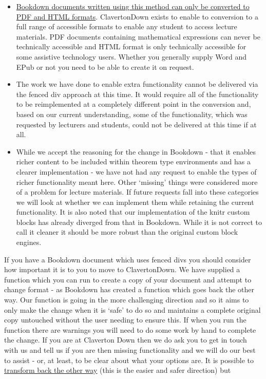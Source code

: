 \documentclass[
  17pt,
  a4paper]{extarticle}
\providecommand{\tightlist}{%
  \setlength{\itemsep}{0pt}\setlength{\parskip}{0pt}}
\theoremstyle{plain}
\theoremstyle{definition}
\theoremstyle{plain}
\theoremstyle{plain}
\theoremstyle{plain}
\theoremstyle{plain}
\theoremstyle{definition}
\theoremstyle{definition}
\theoremstyle{remark}
\theoremstyle{remark}
\renewcommand{\;}{\,}
\begin{document}
\begin{itemize}
\tightlist
\item
  \href{https://bookdown.org/yihui/bookdown/markdown-extensions-by-bookdown.html\#theorem-engine}{Bookdown documents written using this method can only be converted to PDF and HTML formats}. ClavertonDown exists to enable to conversion to a full range of accessible formats to enable any student to access lecture materials. PDF documents containing mathematical expressions can never be technically accessible and HTML format is only technically accessible for some assistive technology users. Whether you generally supply Word and EPub or not you need to be able to create it on request.
\item
  The work we have done to enable extra functionality cannot be delivered via the fenced div approach at this time. It would require all of the functionality to be reimplemented at a completely different point in the conversion and, based on our current understanding, some of the functionality, which was requested by lecturers and students, could not be delivered at this time if at all.
\item
  While we accept the reasoning for the change in Bookdown - that it enables richer content to be included within theorem type environments and has a clearer implementation - we have not had any request to enable the types of richer functionality meant here. Other `missing' things were considered more of a problem for lecture materials. If future requests fall into these categories we will look at whether we can implement them while retaining the current functionality. It is also noted that our implementation of the knitr custom blocks has already diverged from that in Bookdown. While it is not correct to call it cleaner it should be more robust than the original custom block engines.
\end{itemize}

If you have a Bookdown document which uses fenced divs you should consider how important it is to you to move to ClavertonDown. We have supplied a function which you can run to create a copy of your document and attempt to change format - as Bookdown has created a function which goes back the other way. Our function is going in the more challenging direction and so it aims to only make the change when it is `safe' to do so and maintains a complete original copy untouched without the user needing to ensure this. If when you run the function there are warnings you will need to do some work by hand to complete the change. If you are at Claverton Down then we do ask you to get in touch with us and tell us if you are then missing functionality and we will do our best to assist - or, at least, to be clear about what your options are. It is possible to \href{https://bookdown.org/yihui/bookdown/markdown-extensions-by-bookdown.html\#theorem-engine}{transform back the other way} (this is the easier and safer direction) but
\end{document}

